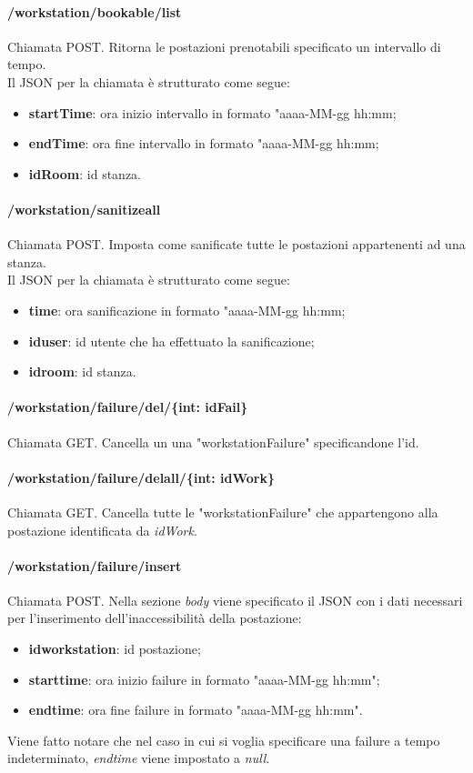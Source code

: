 \paragraph{/workstation/bookable/list}
Chiamata POST. Ritorna le postazioni prenotabili specificato un intervallo di tempo.\\
Il JSON per la chiamata è strutturato come segue:
\begin{itemize}
	\item \textbf{startTime}: ora inizio intervallo in formato "aaaa-MM-gg hh:mm;
	\item \textbf{endTime}: ora fine intervallo in formato "aaaa-MM-gg hh:mm;
	\item \textbf{idRoom}: id stanza.
\end{itemize}
\paragraph{/workstation/sanitizeall}
Chiamata POST. Imposta come sanificate tutte le postazioni appartenenti ad una stanza.\\
Il JSON per la chiamata è strutturato come segue:
\begin{itemize}
	\item \textbf{time}: ora sanificazione in formato "aaaa-MM-gg hh:mm;
	\item \textbf{iduser}: id utente che ha effettuato la sanificazione;
	\item \textbf{idroom}: id stanza.
\end{itemize}
\paragraph{/workstation/failure/del/\{int: idFail\}}
Chiamata GET. Cancella un una "workstationFailure" specificandone l'id.
\paragraph{/workstation/failure/delall/\{int: idWork\}}
Chiamata GET. Cancella tutte le "workstationFailure" che appartengono alla postazione identificata da \textit{idWork}.
\paragraph{/workstation/failure/insert}
Chiamata POST. Nella sezione \textit{body} viene specificato il JSON con i dati necessari per l'inserimento dell'inaccessibilità della postazione:
\begin{itemize}
	\item \textbf{idworkstation}: id postazione;
	\item \textbf{starttime}: ora inizio failure in formato "aaaa-MM-gg hh:mm";
	\item \textbf{endtime}: ora fine failure in formato "aaaa-MM-gg hh:mm".
\end{itemize}
Viene fatto notare che nel caso in cui si voglia specificare una failure a tempo indeterminato, \textit{endtime} viene impostato a \textit{null}.
